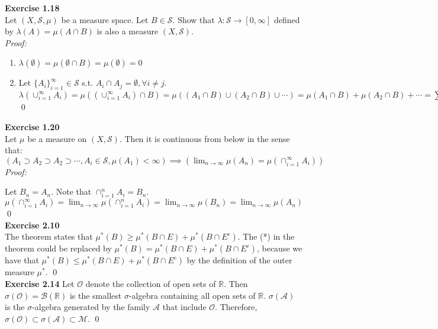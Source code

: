 \documentclass[letterpaper,12pt]{article}
\theoremstyle{definition}
\begin{document}
\textbf{Exercise 1.18} \\
Let $(X, \mathcal{S}, \mu)$ be a measure space. Let $B \in \mathcal{S}$. Show that $\lambda:\mathcal{S}\rightarrow[0,\infty]$ defined by $\lambda(A) = \mu(A \cap B)$ is also a measure $(X, \mathcal{S})$.\\
\textit{Proof:}
\begin{enumerate}
\item $\lambda(\emptyset) = \mu(\emptyset \cap B) = \mu(\emptyset) = 0$
\item Let $\{A_i\}_{i=1}^\infty \in \mathcal{S}$ s.t. $A_i \cap A_j = \emptyset, \forall i \neq j$.\\
$\lambda(\cup_{i=1}^\infty A_i) = \mu((\cup_{i=1}^\infty A_i) \cap B) = \mu((A_1 \cap B) \cup (A_2 \cap B) \cup \cdots) = \mu(A_1 \cap B) + \mu(A_2 \cap B) + \cdots = \sum_{i=1}^\infty \mu(A_i \cap B) = \sum_{i=1}^\infty \lambda(A_i)$ \qed
\end{enumerate}

\textbf{Exercise 1.20}\\
Let $\mu$ be a measure on $(X, \mathcal{S})$. Then it is continuous from below in the sense that:
$(A_1 \supset A_2 \supset A_2 \supset \cdots, A_i \in \mathcal{S}, \mu(A_1) < \infty) \implies (\lim_{n \to \infty} \mu(A_n) = \mu(\cap_{i=1}^\infty A_i))$\\
\textit{Proof:}

Let $B_n = A_n$. Note that $\cap_{i=1}^n A_i = B_n$. \\
$\mu(\cap_{i=1}^\infty A_i) = \lim_{n \to \infty} \mu(\cap_{i=1}^n A_i) = \lim_{n \to \infty} \mu(B_n) = \lim_{n \to \infty} \mu(A_n)$ \qed \\

\textbf{Exercise 2.10} \\
The theorem states that
$\mu^*(B) \geq \mu^*(B \cap E) + \mu^*(B \cap E^c)$.
The (*) in the theorem could be replaced by $\mu^*(B) = \mu^*(B \cap E) + \mu^*(B \cap E^c)$, because we have that $\mu^*(B) \leq \mu^*(B \cap E) + \mu^*(B \cap E^c)$ by the definition of the outer measure $\mu^*$. \qed \\

\textbf{Exercise 2.14}
Let $\mathcal{O}$ denote the collection of open sets of $\mathbb{R}$. Then $\sigma(\mathcal{O}) = \mathcal{B}(\mathbb{R})$ is the smallest $\sigma$-algebra containing all open sets of $\mathbb{R}$. $\sigma(\mathcal{A})$ is the $\sigma$-algebra generated by the family $\mathcal{A}$ that include $\mathcal{O}$. Therefore, $\sigma(\mathcal{O}) \subset \sigma(\mathcal{A}) \subset \mathcal{M}$. \qed \\
\end{document}
